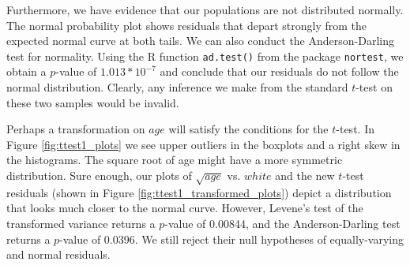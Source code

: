 \par \bigskip Furthermore, we have evidence that our populations are not distributed normally. The normal probability plot shows residuals that depart strongly from the expected normal curve at both tails. We can also conduct the Anderson-Darling test for normality. Using the R function \texttt{ad.test()} from the package \texttt{nortest}, we obtain a $p$-value of $1.013*10^{-7}$ and conclude that our residuals do not follow the normal distribution. Clearly, any inference we make from the standard $t$-test on these two samples would be invalid.

\newpage

\par \bigskip Perhaps a transformation on $age$ will satisfy the conditions for the $t$-test. In Figure \ref{fig:ttest1_plots} we see upper outliers in the boxplots and a right skew in the histograms. The square root of age might have a more symmetric distribution. Sure enough, our plots of $\sqrt{age}$ vs. $white$ and the new $t$-test residuals (shown in Figure \ref{fig:ttest1_transformed_plots}) depict a distribution that looks much closer to the normal curve. However, Levene's test of the transformed variance returns a $p$-value of 0.00844, and the Anderson-Darling test returns a $p$-value of 0.0396. We still reject their null hypotheses of equally-varying and normal residuals.

